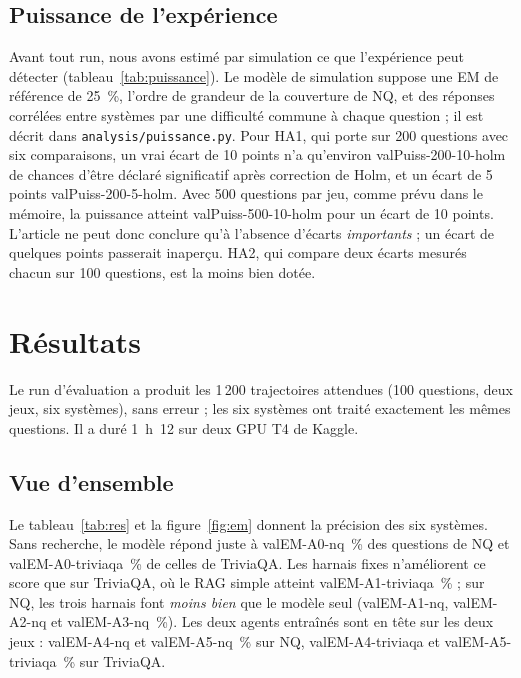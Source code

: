 \documentclass[11pt,a4paper]{article}
\newif\iffictif
\newcommand{\valEM}[2]{\csname valEM-#1-#2\endcsname}         %
\newcommand{\valPuiss}[3]{\csname valPuiss-#1-#2-#3\endcsname} %
\newcommand{\fictifnote}[1]{\iffictif\par\noindent\fcolorbox{red}{red!4}{\parbox{\dimexpr\linewidth-2\fboxsep-2\fboxrule}{\small\textcolor{red!70!black}{\textbf{Données fictives.} #1}}}\par\medskip\fi}
\begin{document}
\subsection{Puissance de l'expérience}
Avant tout run, nous avons estimé par simulation ce que l'expérience peut détecter (tableau~\ref{tab:puissance}). Le modèle de simulation suppose une EM de référence de 25~\%, l'ordre de grandeur de la couverture de NQ, et des réponses corrélées entre systèmes par une difficulté commune à chaque question ; il est décrit dans \texttt{analysis/puissance.py}. Pour HA1, qui porte sur 200 questions avec six comparaisons, un vrai écart de 10 points n'a qu'environ \valPuiss{200}{10}{holm} de chances d'être déclaré significatif après correction de Holm, et un écart de 5 points \valPuiss{200}{5}{holm}. Avec 500 questions par jeu, comme prévu dans le mémoire, la puissance atteint \valPuiss{500}{10}{holm} pour un écart de 10 points. L'article ne peut donc conclure qu'à l'absence d'écarts \emph{importants} ; un écart de quelques points passerait inaperçu. HA2, qui compare deux écarts mesurés chacun sur 100 questions, est la moins bien dotée.

\begin{table}[ht]
\centering\small

\caption{Puissance du test de McNemar apparié selon le nombre de questions et l'écart réel d'EM entre deux systèmes : part de 1\,000 simulations où l'écart est déclaré significatif, au seuil de 5~\% et au seuil le plus strict de la correction de Holm pour six comparaisons (5~\%/6). EM de référence : 25~\%. Ce tableau ne dépend d'aucune donnée observée.}
\label{tab:puissance}
\end{table}

\FloatBarrier
\section{Résultats}\label{sec:resultats}

\fictifnote{Tableaux et figures produits par \texttt{analysis/analyse\_mini.py} à partir des fichiers fictifs.}

Le run d'évaluation a produit les 1\,200 trajectoires attendues (100 questions, deux jeux, six systèmes), sans erreur ; les six systèmes ont traité exactement les mêmes questions. Il a duré 1~h~12 sur deux GPU T4 de Kaggle.

\subsection{Vue d'ensemble}
Le tableau~\ref{tab:res} et la figure~\ref{fig:em} donnent la précision des six systèmes. Sans recherche, le modèle répond juste à \valEM{A0}{nq}~\% des questions de NQ et \valEM{A0}{triviaqa}~\% de celles de TriviaQA. Les harnais fixes n'améliorent ce score que sur TriviaQA, où le RAG simple atteint \valEM{A1}{triviaqa}~\% ; sur NQ, les trois harnais font \emph{moins bien} que le modèle seul (\valEM{A1}{nq}, \valEM{A2}{nq} et \valEM{A3}{nq}~\%). Les deux agents entraînés sont en tête sur les deux jeux : \valEM{A4}{nq} et \valEM{A5}{nq}~\% sur NQ, \valEM{A4}{triviaqa} et \valEM{A5}{triviaqa}~\% sur TriviaQA.
\end{document}
